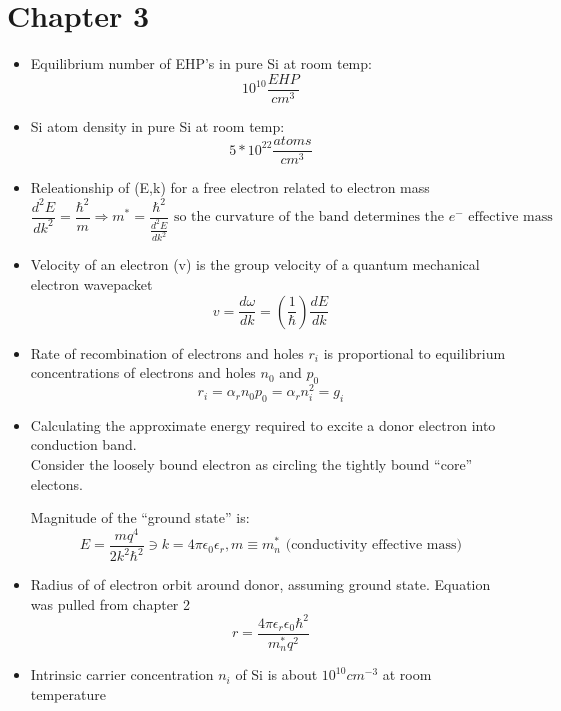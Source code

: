 \documentclass{article}
\begin{document}
\section{Chapter 3}
\begin{itemize}
\item Equilibrium number of EHP's in pure Si at room temp: $$10^{10}\frac{EHP}{cm^3}$$
\item Si atom density in pure Si at room temp: $$5*10^{22}\frac{atoms}{cm^3}$$
\item Releationship of (E,k) for a free electron related to electron mass
  \begin{equation}
    \frac{d^{2}E}{dk^2}=\frac{\hbar^2}{m}\Rightarrow m^*=\frac{\hbar^2}{\frac{d^2E}{dk^2}}\text{~so~the~curvature~of~the~band~determines~the~}e^{-}\text{~effective~mass}
  \end{equation}
\item Velocity of an electron (v) is the group velocity of a quantum mechanical electron wavepacket
  \begin{equation}v=\frac{d\omega}{dk} = (\frac{1}{\hbar})\frac{dE}{dk}\end{equation}
\item Rate of recombination of electrons and holes $r_i$ is proportional to equilibrium concentrations of electrons and holes $n_0$ and $p_0$
  \begin{equation}r_i=\alpha_rn_0p_0=\alpha_rn_i^2=g_i\end{equation}
\item Calculating the approximate energy required to excite a donor electron into conduction band.  \\
  
  Consider the loosely bound electron as circling the tightly bound ``core'' electons.

  Magnitude of the ``ground state'' is:
  \begin{equation}E=\frac{mq^4}{2k^2\hbar^2}\ni k=4\pi\epsilon_0\epsilon_r, m\equiv m_n^*\text{~(conductivity~effective~mass)}\end{equation}
\item Radius of of electron orbit around donor, assuming ground state.  Equation was pulled from chapter 2
  \begin{equation}r=\frac{4\pi\epsilon_r\epsilon_0\hbar^2}{m_n^*q^2}\end{equation} 
\item Intrinsic carrier concentration $n_i$ of Si is about $10^{10}cm^{-3}$ at room temperature
\end{itemize}
\end{document}
